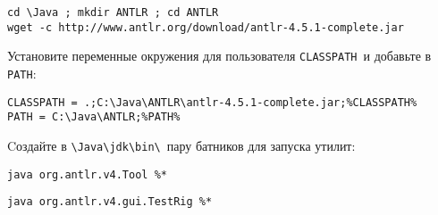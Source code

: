 \subsubsection{\win}

\begin{verbatim}
cd \Java ; mkdir ANTLR ; cd ANTLR
wget -c http://www.antlr.org/download/antlr-4.5.1-complete.jar
\end{verbatim}

Установите переменные окружения для пользователя \verb|CLASSPATH|\ и добавьте в \verb|PATH|:

\begin{verbatim}
CLASSPATH = .;C:\Java\ANTLR\antlr-4.5.1-complete.jar;%CLASSPATH%
PATH = C:\Java\ANTLR;%PATH%
\end{verbatim}

Cоздайте в \verb|\Java\jdk\bin\|\ пару батников для запуска утилит:

\begin{lstlisting}[title=\file{antlr4.bat}]
java org.antlr.v4.Tool %*
\end{lstlisting}
\begin{lstlisting}[title=\file{grun.bat}]
java org.antlr.v4.gui.TestRig %*
\end{lstlisting}

\label{adkinstall}

\secup

\secup
